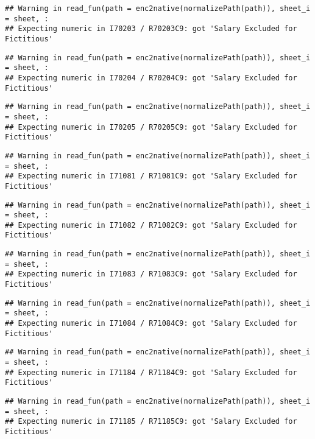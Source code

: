 \documentclass[
]{article}
\begin{document}
\begin{verbatim}
## Warning in read_fun(path = enc2native(normalizePath(path)), sheet_i = sheet, :
## Expecting numeric in I70203 / R70203C9: got 'Salary Excluded for Fictitious'
\end{verbatim}

\begin{verbatim}
## Warning in read_fun(path = enc2native(normalizePath(path)), sheet_i = sheet, :
## Expecting numeric in I70204 / R70204C9: got 'Salary Excluded for Fictitious'
\end{verbatim}

\begin{verbatim}
## Warning in read_fun(path = enc2native(normalizePath(path)), sheet_i = sheet, :
## Expecting numeric in I70205 / R70205C9: got 'Salary Excluded for Fictitious'
\end{verbatim}

\begin{verbatim}
## Warning in read_fun(path = enc2native(normalizePath(path)), sheet_i = sheet, :
## Expecting numeric in I71081 / R71081C9: got 'Salary Excluded for Fictitious'
\end{verbatim}

\begin{verbatim}
## Warning in read_fun(path = enc2native(normalizePath(path)), sheet_i = sheet, :
## Expecting numeric in I71082 / R71082C9: got 'Salary Excluded for Fictitious'
\end{verbatim}

\begin{verbatim}
## Warning in read_fun(path = enc2native(normalizePath(path)), sheet_i = sheet, :
## Expecting numeric in I71083 / R71083C9: got 'Salary Excluded for Fictitious'
\end{verbatim}

\begin{verbatim}
## Warning in read_fun(path = enc2native(normalizePath(path)), sheet_i = sheet, :
## Expecting numeric in I71084 / R71084C9: got 'Salary Excluded for Fictitious'
\end{verbatim}

\begin{verbatim}
## Warning in read_fun(path = enc2native(normalizePath(path)), sheet_i = sheet, :
## Expecting numeric in I71184 / R71184C9: got 'Salary Excluded for Fictitious'
\end{verbatim}

\begin{verbatim}
## Warning in read_fun(path = enc2native(normalizePath(path)), sheet_i = sheet, :
## Expecting numeric in I71185 / R71185C9: got 'Salary Excluded for Fictitious'
\end{verbatim}
\end{document}
